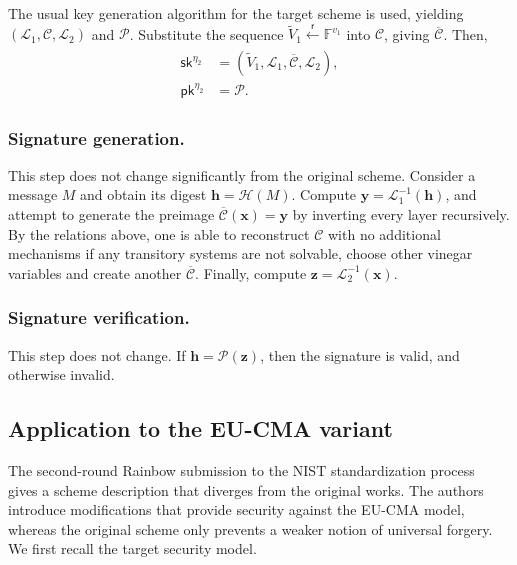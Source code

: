 \documentclass[12pt, a4paper, oneside]{memoir}
\newcommand{\random}{\overset{\mathsf{r}}{\gets}}
\theoremstyle{definition}
\begin{document}
The usual key generation algorithm for the target scheme is used, yielding $(\mathcal{L}_{1}, \mathcal{C}, \mathcal{L}_{2})$ and $\mathcal{P}$. Substitute the sequence $\widetilde{V}_{1} \random \mathbb{F}^{v_{1}}$ into $\mathcal{C}$, giving $\overline{\mathcal{C}}$. Then,
\begin{align}
  \begin{split}
    \mathsf{sk}^{\eta_{2}} &= (\widetilde{V}_{1}, \mathcal{L}_{1}, \overline{\mathcal{C}}, \mathcal{L}_{2}), \\
    \mathsf{pk}^{\eta_{2}} &= \mathcal{P}.
  \end{split}
\end{align}

\subsubsection{Signature generation.}

This step does not change significantly from the original scheme. Consider a message $M$ and obtain its digest $\mathbf{h} = \mathcal{H}(M)$. Compute $\mathbf{y} = \mathcal{L}_{1}^{-1}(\mathbf{h})$, and attempt to generate the preimage $\overline{\mathcal{C}}(\mathbf{x}) = \mathbf{y}$ by inverting every layer recursively. By the relations above, one is able to reconstruct $\mathcal{C}$ with no additional mechanisms if any transitory systems are not solvable, choose other vinegar variables and create another $\overline{\mathcal{C}}$. Finally, compute $\mathbf{z} = \mathcal{L}_{2}^{-1}(\mathbf{x})$.

\subsubsection{Signature verification.}

This step does not change. If $\mathbf{h} = \mathcal{P}(\mathbf{z})$, then the signature is valid, and otherwise invalid.

\subsection{Application to the EU-CMA variant}

The second-round Rainbow submission to the NIST standardization process~\cite{Ding:201901} gives a scheme description that diverges from the original works. The authors introduce modifications that provide security against the \textsf{EU-CMA} model, whereas the original scheme only prevents a weaker notion of universal forgery. We first recall the target security model.
\end{document}
